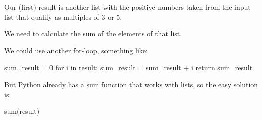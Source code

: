 \documentclass[11pt]{article}
\begin{document}
Our (first) result is another list with the positive numbers taken
from the input list that qualify as multiples of 3 or 5.

We need to calculate the sum of the elements of that list.

We could use another for-loop, something like:

sum\_result = 0
for i in result:
    sum\_result = sum\_result + i
return sum\_result

But Python already has a sum function that works with lists, so the
easy solution is:

sum(result)
\end{document}
